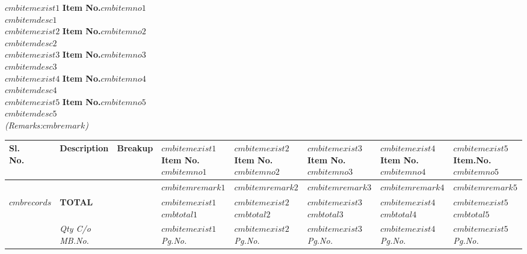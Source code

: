 
$cmbitemexist1$
\noindent\textbf{Item No.$cmbitemno1$}\\
\noindent $cmbitemdesc1$\\
\fi
$cmbitemexist2$
\noindent\textbf{Item No.$cmbitemno2$}\\
\noindent $cmbitemdesc2$\\
\fi
$cmbitemexist3$
\noindent\textbf{Item No.$cmbitemno3$}\\
\noindent $cmbitemdesc3$\\
\fi
$cmbitemexist4$
\noindent\textbf{Item No.$cmbitemno4$}\\
\noindent $cmbitemdesc4$\\
\fi
$cmbitemexist5$
\noindent\textbf{Item No.$cmbitemno5$}\\
\noindent $cmbitemdesc5$\\
\fi
\noindent\emph{(Remarks:$cmbremark$)}\\
\vspace*{-\baselineskip}
\begin{longtabu} to \textwidth {|X[1,c]|X[10,l]|X[5,l]|X[3,r]|X[3,r]|X[3,r]|X[3,r]|X[3,r]|}
   \hline
    \textbf{Sl.\newline No.} & \textbf{Description} & \textbf{Breakup} & $cmbitemexist1$\textbf{Item No. $cmbitemno1$}\fi & $cmbitemexist2$\textbf{Item No. $cmbitemno2$}\fi & $cmbitemexist3$\textbf{Item No. $cmbitemno3$}\fi & $cmbitemexist4$\textbf{Item No. $cmbitemno4$}\fi & $cmbitemexist5$\textbf{Item.No. $cmbitemno5$}\fi \\
   \hline
     &  &  & \emph{$cmbitemremark1$} & \emph{$cmbitemremark2$} & \emph{$cmbitemremark3$} & \emph{$cmbitemremark4$} & \emph{$cmbitemremark5$} \\
   \hline
    \endhead
$cmbrecords$
    \hline
      & \textbf{TOTAL} & & $cmbitemexist1$ \textbf{$cmbtotal1$} \fi & $cmbitemexist2$ \textbf{$cmbtotal2$} \fi & $cmbitemexist3$ \textbf{$cmbtotal3$} \fi & $cmbitemexist4$ \textbf{$cmbtotal4$} \fi & $cmbitemexist5$ \textbf{$cmbtotal5$} \fi \\
   \hline
      & \emph{Qty C/o MB.No. } &  & $cmbitemexist1$\emph{Pg.No. \pageref{$cmbcarriedover1$}} \label{$cmblabel1$}\fi & $cmbitemexist2$\emph{Pg.No. \pageref{$cmbcarriedover2$}} \label{$cmblabel2$}\fi & $cmbitemexist3$\emph{Pg.No. \pageref{$cmbcarriedover3$}} \label{$cmblabel3$} \fi & $cmbitemexist4$\emph{Pg.No. \pageref{$cmbcarriedover4$}} \label{$cmblabel4$} \fi & $cmbitemexist5$\emph{Pg.No. \pageref{$cmbcarriedover5$}} \label{$cmblabel5$}\fi \\
   \hline
\end{longtabu}

